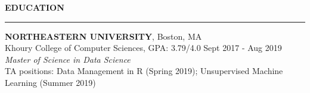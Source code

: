 \documentclass[a4paper]{article}
\newcommand{\myline}{\par
  \kern2pt %
  \hrule height 0.5pt
  \kern2pt %
}
\newcommand{\mybullet}{
	\indent 
  \textbullet \hspace*{2mm}
}
\begin{document}

	\noindent
	{\large \textbf{EDUCATION}}
	\myline 
	\smallskip
	
	\noindent
	\textbf{NORTHEASTERN UNIVERSITY}, Boston, MA \\
	Khoury College of Computer Sciences, GPA: 3.79/4.0 
        \hfill Sept 2017 - Aug 2019 \\
	\textit{Master of Science in Data Science} \\
  TA positions: Data Management in R (Spring 2019); Unsupervised Machine Learning (Summer 2019) \\
\end{document}

